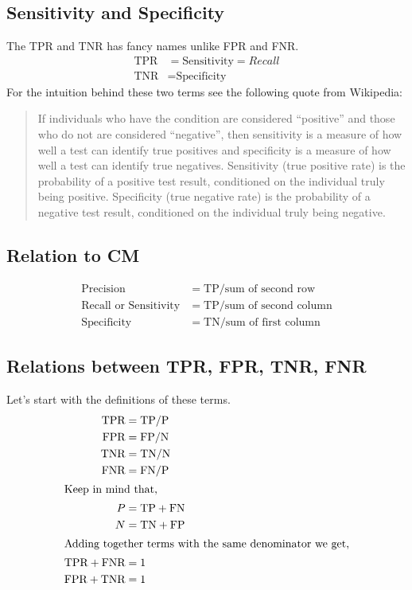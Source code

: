 \documentclass{../template/texnote}
\begin{document}
\subsection{Sensitivity and Specificity}
The TPR and TNR has fancy names unlike FPR and FNR.
\begin{align}
    \textrm{TPR} &= \textrm{Sensitivity} = Recall \\
    \textrm{TNR} &= \textrm{Specificity}
\end{align}
For the intuition behind these two terms see the following quote from Wikipedia:
\begin{quote}

If individuals who have the condition are considered ``positive'' and those who do not are considered ``negative'', then sensitivity is a measure of how well a test can identify true positives and specificity is a measure of how well a test can identify true negatives. Sensitivity (true positive rate) is the probability of a positive test result, conditioned on the individual truly being positive. Specificity (true negative rate) is the probability of a negative test result, conditioned on the individual truly being negative.
\end{quote}
\subsection{Relation to CM}
\begin{align}
    \textrm{Precision} &= \textrm{TP} / \textrm{sum of second row} \\
    \textrm{Recall or Sensitivity} &= \textrm{TP} / \textrm{sum of second column} \\
    \textrm{Specificity} &= \textrm{TN} / \textrm{sum of first column}
\end{align}
\subsection{Relations between TPR, FPR, TNR, FNR}
Let's start with the definitions of these terms.
\begin{align}
    \textrm{TPR} &= \textrm{TP}/\textrm{P} \\
    \textrm{FPR} &= \textrm{FP}/\textrm{N} \\
    \textrm{TNR} &= \textrm{TN}/\textrm{N} \\
    \textrm{FNR} &= \textrm{FN}/\textrm{P} \\
    \intertext{Keep in mind that,}
    P &= \textrm{TP} + \textrm{FN} \\
    N &= \textrm{TN} + \textrm{FP} \\
    \intertext{Adding together terms with the same denominator we get,}
    \textrm{TPR} + \textrm{FNR} &= 1 \\
    \textrm{FPR} + \textrm{TNR} &= 1
\end{align}
\end{document}
